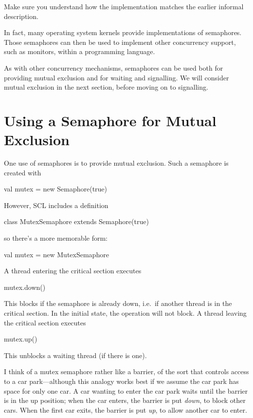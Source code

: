 \begin{instruction}
Make sure you understand how the implementation matches the earlier informal
description.
\end{instruction}

In fact, many operating system kernels provide implementations of semaphores.
Those semaphores can then be used to implement other concurrency support, such
as monitors, within a programming language.

As with other concurrency mechanisms, semaphores can be used both for
providing mutual exclusion and for waiting and signalling.  We will consider
mutual exclusion in the next section, before moving on to signalling.


\section{Using a Semaphore for Mutual Exclusion}

One use of semaphores is to provide mutual 
exclusion.
%
Such a semaphore is created with
\begin{scala}
  val mutex = new Semaphore(true)
\end{scala}
However, SCL includes a definition
\begin{scala}
  class MutexSemaphore extends Semaphore(true)
\end{scala}
so there's a more memorable form:
\begin{scala}
  val mutex = new MutexSemaphore
\end{scala}


A thread entering the critical section executes
\begin{scala}
  mutex.down()
\end{scala}
%
This blocks if the semaphore is already down, i.e.~if another thread is in the
critical section.  In the initial state, the operation will not block. 
%
A thread leaving the critical section executes
\begin{scala}
  mutex.up()
\end{scala}
%
This unblocks a waiting thread (if there is one).

I think of a mutex semaphore rather like a barrier, of the sort that controls
access to a car park---although this analogy works best if we assume the car
park has space for only one car.  A car wanting to enter the car park waits
until the barrier is in the up position; when the car enters, the barrier is
put \emph{down}, to block other cars.  When the first car exits, the barrier
is put \emph{up}, to allow another car to enter.

